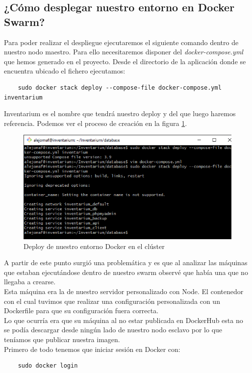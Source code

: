 \subsection{¿Cómo desplegar nuestro entorno en Docker Swarm?}
Para poder realizar el despliegue ejecutaremos el siguiente comando dentro de nuestro nodo maestro. Para ello necesitaremos disponer del \textit{docker-compose.yml} que hemos generado en el proyecto. Desde el directorio de la aplicación donde se encuentra ubicado el fichero ejecutamos:
\begin{verbatim}
    sudo docker stack deploy --compose-file docker-compose.yml inventarium
\end{verbatim}
Inventarium es el nombre que tendrá nuestro deploy y del que luego haremos referencia. Podemos ver el proceso de creación en la figura \ref{fig:docker-stack-deploy}.
\begin{figure}
    \centering
    \includegraphics[scale=0.5, keepaspectratio]{imagenes/complemento/docker-swarm/docker-stack-deploy.png}
    \caption{Deploy de nuestro entorno Docker en el clúster}\label{fig:docker-stack-deploy}
\end{figure}
A partir de este punto surgió una problemática y es que al analizar las máquinas que estaban ejecutándose dentro de nuestro swarm observé que había una que no llegaba a crearse.
\\Esta máquina era la de nuestro servidor personalizado con Node. El contenedor con el cual tuvimos que realizar una configuración personalizada con un Dockerfile para que su configuración fuera correcta.
\\Lo que ocurría era que su máquina al no estar publicada en DockerHub esta no se podía descargar desde ningún lado de nuestro nodo esclavo por lo que teníamos que publicar nuestra imagen.
\\Primero de todo tenemos que iniciar sesión en Docker con:
\begin{verbatim}
    sudo docker login
\end{verbatim}
